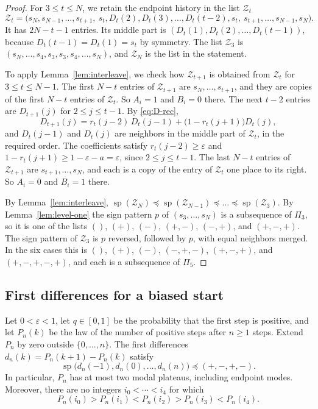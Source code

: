\begin{proof}
For $3\le t\le N$, we retain the endpoint history in the list $\mathcal Z_t$
\[
 \mathcal Z_t=\bigl(s_N,s_{N-1},\dots,s_{t+1},\ s_t,D_t(2),D_t(3),\dots,D_t(t-2),s_t,\
 s_{t+1},\dots,s_{N-1},s_N\bigr).
\]
It has $2N-t-1$ entries. Its middle part is
$(D_t(1),D_t(2),\dots,D_t(t-1))$, because $D_t(t-1)=D_t(1)=s_t$ by symmetry.
The list $\mathcal Z_3$ is $(s_N,\dots,s_4,s_3,s_3,s_4,\dots,s_N)$, and $\mathcal Z_N$ is the
list in the statement.

To apply Lemma~\ref{lem:interleave}, we check how
$\mathcal Z_{t+1}$ is obtained from $\mathcal Z_t$ for $3\le t\le N-1$. The first $N-t$ entries of
$\mathcal Z_{t+1}$ are $s_N,\dots,s_{t+1}$, and they are copies of the first $N-t$
entries of $\mathcal Z_t$. So $A_i=1$ and $B_i=0$ there. The next $t-2$ entries are
$D_{t+1}(j)$ for $2\le j\le t-1$. By \eqref{eq:D-rec},
\[
 D_{t+1}(j)=r_t(j-2)\,D_t(j-1)+\bigl(1-r_t(j+1)\bigr)D_t(j),
\]
and $D_t(j-1)$ and $D_t(j)$ are neighbors in the middle part of $\mathcal Z_t$, in the
required order. The coefficients satisfy $r_t(j-2)\ge\varepsilon$ and
$1-r_t(j+1)\ge1-\varepsilon-a=\varepsilon$, since $2\le j\le t-1$. The last
$N-t$ entries of $\mathcal Z_{t+1}$ are $s_{t+1},\dots,s_N$, and each is a copy of the
entry of $\mathcal Z_t$ one place to its right. So $A_i=0$ and $B_i=1$ there.

By Lemma~\ref{lem:interleave},
$\operatorname{sp}(\mathcal Z_N)\preceq\operatorname{sp}(\mathcal Z_{N-1})\preceq\dots\preceq\operatorname{sp}(\mathcal Z_3)$.
By Lemma~\ref{lem:level-one} the sign pattern $p$ of $(s_3,\dots,s_N)$ is a
subsequence of $\Pi_3$, so it is one of the lists $()$, $(+)$, $(-)$, $(+,-)$,
$(-,+)$, and $(+,-,+)$. The sign pattern of $\mathcal Z_3$ is $p$ reversed, followed by
$p$, with equal neighbors merged. In the six cases this is $()$, $(+)$, $(-)$,
$(-,+,-)$, $(+,-,+)$, and $(+,-,+,-,+)$, and each is a subsequence of $\Pi_5$.
\end{proof}

\subsection{First differences for a biased start}\label{sec:biased-finite}

\begin{proposition}\label{prop:all-bias-modes}
Let $0<\varepsilon<1$, let $q\in[0,1]$ be the probability that the first
step is positive, and let $P_n(k)$ be the law of the number of positive
steps after $n\ge1$ steps. Extend $P_n$ by zero outside $\{0,\ldots,n\}$.
The first differences $d_n(k)=P_n(k+1)-P_n(k)$ satisfy
\[
 \operatorname{sp}\bigl(d_n(-1),d_n(0),\ldots,d_n(n)\bigr)
 \preceq (+,-,+,-).
\]
In particular, $P_n$ has at most two modal plateaus, including endpoint
modes. Moreover, there are no integers $i_0<\cdots<i_4$ for which
\[
 P_n(i_0)>P_n(i_1)<P_n(i_2)>P_n(i_3)<P_n(i_4).
\]
\end{proposition}

